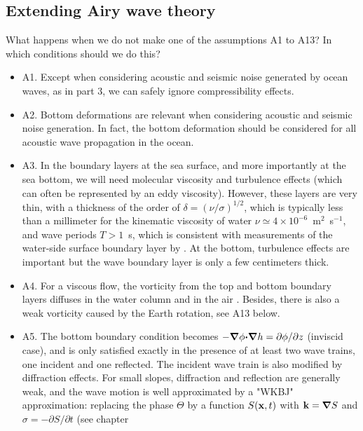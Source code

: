 \subsection{Extending Airy wave theory}
What happens when we do not make one of the assumptions A1 to A13? In which conditions should we do this? 
\begin{itemize}
  \item A1. Except when considering acoustic and seismic noise generated by ocean waves, as in part 3, we can 
safely ignore compressibility effects. \vspace{0.3cm}
  \item A2. Bottom deformations are relevant when considering acoustic and seismic noise generation. In fact, the bottom 
deformation should be considered for all acoustic wave propagation in the ocean.  \vspace{0.3cm}
  \item A3. In the boundary layers at the sea surface, and more importantly at the sea bottom, 
we will need molecular viscosity and turbulence effects (which can often be represented by an eddy viscosity). 
However, these layers are very thin, with a thickness of the order of 
  $\delta=(\nu/\sigma)^{1/2}$, which is typically less than a millimeter for the kinematic viscosity of water 
$\nu \simeq 4\times 10^{-6}$~m$^2$~s$^{-1}$, and wave periods 
   $T > 1$~s, which is consistent with measurements of the water-side surface boundary layer by \cite{Banner&Peirson1998}. At the bottom, 
turbulence effects are important but the wave boundary layer is only a few centimeters thick.\vspace{0.3cm}
  \item A4. For a viscous flow, the vorticity from the top and bottom boundary layers diffuses in the water column 
and in the air \citep{Longuet-Higgins1953,Weber&Forland1990}. Besides, there is also a weak vorticity caused by the 
Earth rotation, see A13 below. \vspace{0.3cm}
  \item A5. The bottom boundary condition becomes $-\mbox{\boldmath $\nabla$} \phi \mbox{\boldmath $\cdot$} \mbox{\boldmath $\nabla$} h = \partial \phi/\partial z$ (inviscid case), 
and is only satisfied exactly in the presence of at least two wave trains, one incident and one reflected. The incident wave train 
is also modified by diffraction effects.
  For small slopes, diffraction and reflection are generally weak, 
and the wave motion is well approximated by a "WKBJ" approximation: replacing the phase  $\Theta$ by a function  $S(\mathbf{x},t)$ 
with $\mathbf{k}=\mbox{\boldmath $\nabla$} S$ and $\sigma=-\partial S/\partial t$ (see chapter 

\end{itemize}
